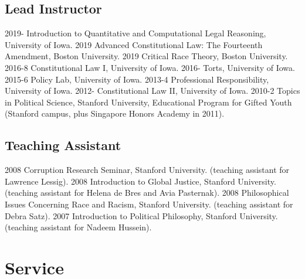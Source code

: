 \documentclass[letterpaper]{moderncv}
\begin{document}
\subsection{Lead Instructor}
\cvitem
{2019-}
{Introduction to Quantitative and Computational Legal Reasoning, University of Iowa.}
\vspace{1mm}
\cvitem
{2019}
{Advanced Constitutional Law: The Fourteenth Amendment, Boston University.}
\vspace{1mm}
\cvitem
{2019}
{Critical Race Theory, Boston University.}
\vspace{1mm}
\cvitem
{2016-8}
{Constitutional Law I, University of Iowa.}
\vspace{1mm}
\cvitem
{2016-}
{Torts, University of Iowa.}
\vspace{1mm}
\cvitem
{2015-6}
{Policy Lab, University of Iowa.}
\vspace{1mm}
\cvitem
{2013-4}
{Professional Responsibility, University of Iowa.}
\vspace{1mm}
\cvitem
{2012-}
{Constitutional Law II, University of Iowa.}
\vspace{1mm}
\cvitem
{2010-2}
{Topics in Political Science, Stanford University, Educational Program for Gifted Youth (Stanford campus, plus Singapore Honors Academy in 2011).}
\vspace{1mm}
\subsection{Teaching Assistant}
\cvitem
{2008}
{Corruption Research Seminar, Stanford University.
  \newline
  (teaching assistant for Lawrence Lessig).
}
\vspace{1mm}
\cvitem
{2008}
{Introduction to Global Justice, Stanford University.
  \newline
  (teaching assistant for Helena de Bres and Avia Pasternak).
}
\vspace{1mm}
\cvitem
{2008}
{Philosophical Issues Concerning Race and Racism, Stanford University.
  \newline
  (teaching assistant for Debra Satz).
}
\vspace{1mm}
\cvitem
{2007}
{Introduction to Political Philosophy, Stanford University.
  \newline
  (teaching assistant for Nadeem Hussein).
}
\vspace{1mm}

\section{Service}
\end{document}
